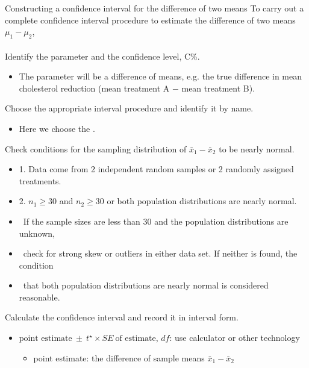 \begin{onebox}{Constructing a confidence interval for the difference of two means}
To carry out a complete confidence interval procedure to estimate the difference of two means $\mu_1 - \mu_2$,
\\
\\
 Identify the parameter and the confidence level, C\%.
\begin{itemize}\vspace{-1mm}
\setlength{\itemsep}{0mm}
\item[] The parameter will be a difference of means, e.g. the true difference in mean cholesterol reduction (mean treatment A $-$ mean treatment B).  
\end{itemize}
  Choose the appropriate interval procedure and identify it by name.  \vspace{-1mm}
\begin{itemize}
\item[] Here we choose the .
\end{itemize}
  Check conditions for the sampling distribution of $\bar{x}_1-\bar{x}_2$ to be nearly normal.\vspace{-1mm}
\begin{itemize}
\setlength{\itemsep}{0mm}
\item[] 1. Data come from 2 independent random samples or 2 randomly assigned treatments. 
\item[] 2. $n_1\ge 30$ and $n_2\ge 30$ or both population distributions are nearly normal.
\item[] \quad \ If the sample sizes are less than 30 and the population distributions are unknown, 
\item[] \quad \ check for strong skew or outliers in either data set.  If neither is found, the condition 
\item[] \quad \ that both population distributions are nearly normal is considered reasonable.  
\end{itemize}
   Calculate the confidence interval and record it in interval form.
\begin{itemize}
\item[] $\text{point estimate}\ \pm \ t^{\star} \times SE\ \text{of estimate}$, \quad $df$: use calculator or other technology
\begin{itemize}
\item[] point estimate: the difference of sample means $\bar{x}_1 - \bar{x}_2$

\end{itemize}
\end{itemize}
\end{onebox}
